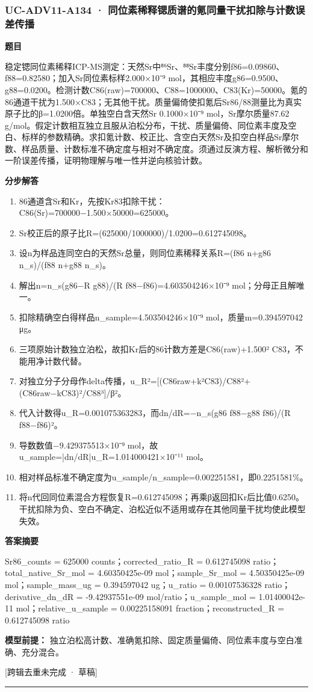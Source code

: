 \documentclass[UTF8,11pt,a4paper]{ctexart}
\begin{document}
\subsubsection*{UC-ADV11-A134 · 同位素稀释锶质谱的氪同量干扰扣除与计数误差传播}
\noindent\textbf{题目}\par
稳定锶同位素稀释ICP-MS测定：天然Sr中⁸⁶Sr、⁸⁸Sr丰度分别f86=0.09860、f88=0.82580；加入Sr同位素标样2.000×10⁻⁹ mol，其相应丰度g86=0.9500、g88=0.0200。检测计数C86(raw)=700000、C88=1000000、C83(Kr)=50000。氪的86通道干扰为1.500×C83；无其他干扰。质量偏倚使扣氪后Sr86/88测量比为真实原子比的β=1.0200倍。单独空白含天然Sr 0.1000×10⁻⁹ mol，Sr摩尔质量87.62 g/mol。假定计数相互独立且服从泊松分布，干扰、质量偏倚、同位素丰度及空白、标样的参数精确。求扣氪计数、校正比、含空白天然Sr及扣空白样品Sr摩尔数、样品质量、计数标准不确定度与相对不确定度。须通过反演方程、解析微分和一阶误差传播，证明物理解与唯一性并逆向核验计数。\par
\medskip\noindent\textbf{分步解答}
\begin{enumerate}
\item 86通道含Sr和Kr，先按Kr83扣除干扰：C86(Sr)=700000−1.500×50000=625000。
\item Sr校正后的原子比R=(625000/1000000)/1.0200=0.612745098。
\item 设n为样品连同空白的天然Sr总量，则同位素稀释关系R=(f86 n+g86 n\_s)/(f88 n+g88 n\_s)。
\item 解出n=n\_s(g86−R g88)/(R f88−f86)=4.603504246×10⁻⁹ mol；分母正且解唯一。
\item 扣除精确空白得样品n\_sample=4.503504246×10⁻⁹ mol，质量m=0.394597042 μg。
\item 三项原始计数独立泊松，故扣Kr后的86计数方差是C86(raw)+1.500² C83，不能用净计数代替。
\item 对独立分子分母作delta传播，u\_R²=[(C86raw+k²C83)/C88²+(C86raw−kC83)²/C88³]/β²。
\item 代入计数得u\_R=0.001075363283，而dn/dR=−n\_s(g86 f88−g88 f86)/(R f88−f86)²。
\item 导数数值−9.429375513×10⁻⁹ mol，故u\_sample=|dn/dR|u\_R=1.014000421×10⁻¹¹ mol。
\item 相对样品标准不确定度为u\_sample/n\_sample=0.002251581，即0.2251581\%。
\item 将n代回同位素混合方程恢复R=0.612745098；再乘β返回扣Kr后比值0.6250。干扰扣除为负、空白不确定、泊松近似不适用或存在其他同量干扰均使此模型失效。
\end{enumerate}
\noindent\textbf{答案摘要}\par
Sr86\_counts = 625000 counts；corrected\_ratio\_R = 0.612745098 ratio；total\_native\_Sr\_mol = 4.60350425e-09 mol；sample\_Sr\_mol = 4.50350425e-09 mol；sample\_mass\_ug = 0.394597042 ug；u\_ratio = 0.00107536328 ratio；derivative\_dn\_dR = -9.42937551e-09 mol/ratio；u\_sample\_mol = 1.01400042e-11 mol；relative\_u\_sample = 0.00225158091 fraction；reconstructed\_R = 0.612745098 ratio\par
\noindent\textbf{模型前提：}
独立泊松高计数、准确氪扣除、固定质量偏倚、同位素丰度与空白准确、充分混合。\par
\noindent\textcolor{red!65!black}{[跨辑去重未完成 · 草稿]} \par
\medskip\hrule\medskip
{}
\end{document}
